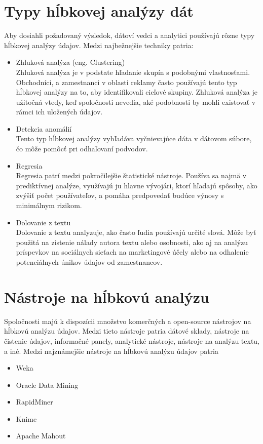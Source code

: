 \documentclass[10pt,twoside,slovak,a4paper]{article}
\begin{document}
\section{Typy hĺbkovej analýzy dát}
Aby dosiahli požadovaný výsledok, dátoví vedci a analytici používajú rôzne typy hĺbkovej analýzy údajov. Medzi najbežnejšie techniky patria:
\begin{itemize}
\item Zhluková analýza (eng. Clustering)\\
Zhluková analýza je v podstate hľadanie skupín s podobnými vlastnosťami. Obchodníci, a zamestnanci v oblasti reklamy často používajú tento typ hĺbkovej analýzy na to, aby identifikovali cieľové skupiny. Zhluková analýza je užitočná vtedy, keď spoločnosti nevedia, aké podobnosti by mohli existovať v rámci ich uložených údajov.
\item Detekcia anomálií\\
Tento typ hĺbkovej analýzy vyhľadáva vyčnievajúce dáta v dátovom súbore, čo môže pomôcť pri odhaľovaní podvodov.
\item Regresia\\
Regresia patrí medzi pokročilejšie štatistické nástroje. Používa sa najmä v prediktívnej analýze, využívajú ju hlavne vývojári, ktorí hľadajú spôsoby, ako zvýšiť počet používateľov, a pomáha predpovedať budúce výnosy s minimálnym rizikom.
\item Dolovanie z textu\\
Dolovanie z textu analyzuje, ako často ľudia používajú určité slová. Môže byť použitá na zistenie nálady autora textu alebo osobnosti, ako aj na analýzu príspevkov na sociálnych sieťach na marketingové účely alebo na odhalenie potenciálnych únikov údajov od zamestnancov.\cite{EmmaCroc}

\end{itemize}
\section{Nástroje na hĺbkovú analýzu}
Spoločnosti majú k dispozícii množstvo komerčných a open-source nástrojov na hĺbkovú analýzu údajov. Medzi tieto nástroje patria dátové sklady, nástroje na čistenie údajov, informačné panely, analytické nástroje, nástroje na analýzu textu, a iné. Medzi najznámejšie nástroje na hĺbkovú analýzu údajov patria
\begin{itemize}
\item Weka
\item Oracle Data Mining
\item RapidMiner
\item Knime 
\item Apache Mahout\cite{ML}
\end{itemize}
\end{document}
